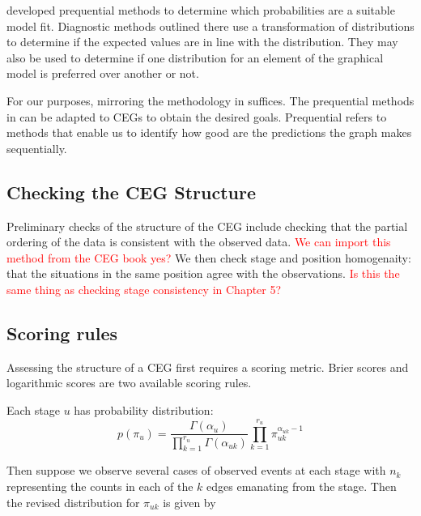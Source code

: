 \documentclass[12pt]{article}
\begin{document}
\cite{DAWID} developed prequential methods to determine which probabilities are a suitable model fit. Diagnostic methods outlined there use a transformation of distributions to determine if the expected values are in line with the distribution. They may also be used to determine if one distribution for an element of the graphical model is preferred over another or not.


%

For our purposes, mirroring the methodology in \cite{diagnostics} suffices. The prequential methods in \cite{diagnostics} can be adapted to CEGs to obtain the desired goals. Prequential refers to methods that enable us to identify how good are the predictions the graph makes sequentially. 

\subsection{Checking the CEG Structure}

Preliminary checks of the structure of the CEG include checking that the partial ordering of the data is consistent with the observed data. \textcolor{red}{We can import this method from the CEG book yes?} We then check stage and position homogenaity: that the situations in the same position agree with the observations. \textcolor{red}{Is this the same thing as checking stage consistency in Chapter 5? }


 
\subsection{Scoring rules}


Assessing the structure of a CEG first requires a scoring metric. Brier scores and logarithmic scores are two available scoring rules. 

Each stage $u$ has probability distribution:
\[
p(\pi_u) = \frac{\Gamma (\alpha_u)}{\prod_{k=1}^{r_u} \Gamma (\alpha_{uk})} \prod_{k=1}^{r_u} \pi_{uk} ^{\alpha_{uk}-1}
\]

Then suppose we observe several cases of observed events at each stage with $n_k$ representing the counts in each of the $k$ edges emanating from the stage. Then the  revised distribution for $\pi_{uk}$ is given by 
\end{document}
